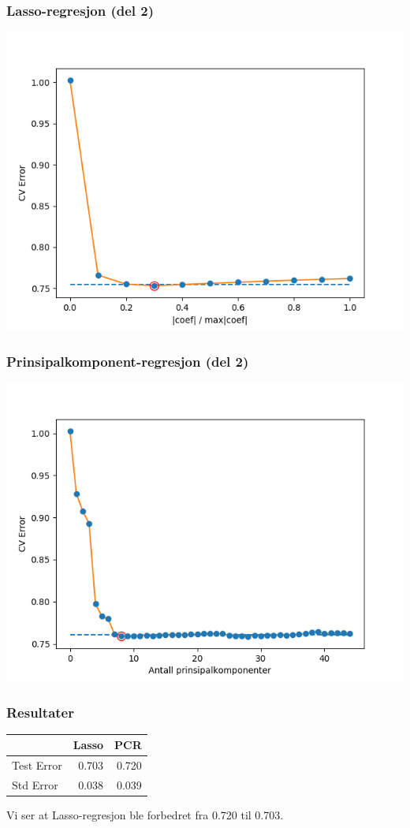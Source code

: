 \documentclass[aspectratio=169]{beamer}
\begin{document}
\begin{frame}
  \frametitle{Lasso-regresjon (del 2)}
  \begin{center}
    \includegraphics[height=0.8\textheight]{lasso_CV2.png}
  \end{center}
\end{frame}

\begin{frame}
    \frametitle{Prinsipalkomponent-regresjon (del 2)}
  \begin{center}
    \includegraphics[height=0.8\textheight]{pcr_CV2.png}
  \end{center}
\end{frame}

\begin{frame}
  \frametitle{Resultater}
\begin{center}
  \begin{tabular}{ l r r}
     & Lasso & PCR \\
    \hline
    Test Error & 0.703 & 0.720 \\
    Std Error & 0.038 & 0.039
  \end{tabular}
  \end{center}

  Vi ser at Lasso-regresjon ble forbedret fra 0.720 til 0.703.
\end{frame}
\end{document}
